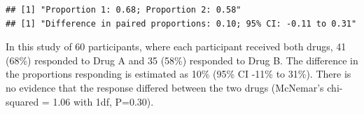 \documentclass[
]{memoir}
\begin{document}
\begin{verbatim}
## [1] "Proportion 1: 0.68; Proportion 2: 0.58"
## [1] "Difference in paired proportions: 0.10; 95% CI: -0.11 to 0.31"
\end{verbatim}

In this study of 60 participants, where each participant received both drugs, 41 (68\%) responded to Drug A and 35 (58\%) responded to Drug B. The difference in the proportions responding is estimated as 10\% (95\% CI -11\% to 31\%). There is no evidence that the response differed between the two drugs (McNemar's chi-squared = 1.06 with 1df, P=0.30).

  
\end{document}
